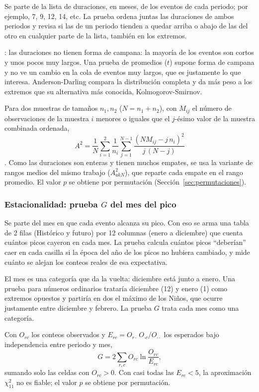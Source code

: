 \documentclass[11pt,a4paper]{article}
\begin{document}
Se parte de la lista de duraciones, en meses, de los eventos de cada periodo; por ejemplo, 7, 9, 12, 14, etc.
La prueba ordena juntas las duraciones de ambos periodos y revisa si las de un periodo tienden a quedar arriba o abajo de las del otro en cualquier parte de la lista, también en los extremos.

: las duraciones no tienen forma de campana: la mayoría de los eventos son cortos y unos pocos muy largos.
Una prueba de promedios ($t$) supone forma de campana y no ve un cambio en la cola de eventos muy largos, que es justamente lo que interesa.
Anderson-Darling compara la distribución completa y da más peso a los extremos que su alternativa más conocida, Kolmogorov-Smirnov.

Para dos muestras de tamaños $n_1, n_2$ ($N = n_1 + n_2$), con $M_{ij}$ el número de observaciones de la muestra $i$ menores o iguales que el $j$-ésimo valor de la muestra combinada ordenada,
\begin{equation}
\label{eq:ad}
A^2 = \frac{1}{N}\sum_{i=1}^{2}\frac{1}{n_i}\sum_{j=1}^{N-1}\frac{(N M_{ij} - j\,n_i)^2}{j\,(N-j)}
\end{equation}
\citep{scholz1987}. Como las duraciones son enteras y tienen muchos empates, se usa la variante de rangos medios del mismo trabajo ($A^2_{akN}$), que reparte cada empate en el rango promedio. El valor $p$ se obtiene por permutación (Sección~\ref{sec:permutaciones}).

\subsubsection{Estacionalidad: prueba $G$ del mes del pico}

Se parte del mes en que cada evento alcanza su pico.
Con eso se arma una tabla de 2 filas (Histórico y futuro) por 12 columnas (enero a diciembre) que cuenta cuántos picos cayeron en cada mes.
La prueba calcula cuántos picos ``deberían'' caer en cada casilla si la época del año de los picos no hubiera cambiado, y mide cuánto se alejan los conteos reales de esa expectativa.

El mes es una categoría que da la vuelta: diciembre está junto a enero.
Una prueba para números ordinarios trataría diciembre (12) y enero (1) como extremos opuestos y partiría en dos el máximo de los Niños, que ocurre justamente entre diciembre y febrero.
La prueba $G$ trata cada mes como una categoría.

Con $O_{rc}$ los conteos observados y $E_{rc} = O_{r\cdot}\,O_{\cdot c}/O_{\cdot\cdot}$ los esperados bajo independencia entre periodo y mes,
\begin{equation}
\label{eq:g}
G = 2\sum_{r,c} O_{rc}\ln\frac{O_{rc}}{E_{rc}},
\end{equation}
sumando solo las celdas con $O_{rc} > 0$.
Con casi todas las $E_{rc} < 5$, la aproximación $\chi^2_{11}$ no es fiable; el valor $p$ se obtiene por permutación.
\end{document}
